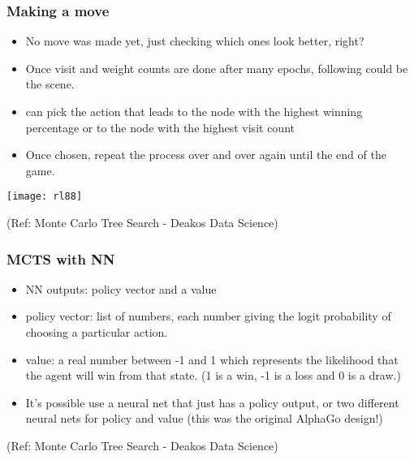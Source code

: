 \begin{frame}[fragile]\frametitle{Making a move}

\begin{itemize}
\item No move was made yet, just checking which ones look better, right?
\item Once visit and weight counts are done after many epochs, following could be the scene.
\item can pick the action that leads to the node with the highest winning percentage or to the node with the highest visit count
\item Once chosen, repeat the process over and over again until the end of the game.
\end{itemize}

\begin{center}
\texttt{[image: rl88]}
\end{center}


{\tiny (Ref: Monte Carlo Tree Search - Deakos Data Science)}

\end{frame}


\begin{frame}[fragile]\frametitle{MCTS with NN}

\begin{itemize}
\item NN outputs: policy vector and a value
\item policy vector: list of numbers, each number giving the logit probability of choosing a particular action. 
\item value: a real number between -1 and 1 which represents the likelihood that the agent will win from that state. (1 is a win, -1 is a loss and 0 is a draw.)
\item It’s possible use a neural net that just has a policy output, or two different neural nets for policy and value (this was the original AlphaGo design!)
\end{itemize}




{\tiny (Ref: Monte Carlo Tree Search - Deakos Data Science)}

\end{frame}

